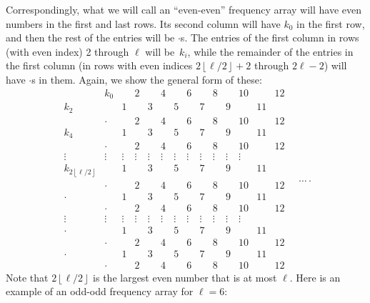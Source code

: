 \documentclass[10pt,a4paper]{amsart}
\numberwithin{equation}{section}
\theoremstyle{definition}
\begin{document}
Correspondingly, what we will call an ``even-even'' frequency array will have even numbers in the first and last rows. Its second column will have $k_0$ in the first row, and then the rest of the entries will be $\cdot$s. The entries of the first column in rows (with even index) 2 through $\ell$ will be~$k_i$, while the remainder of the entries in the first column (in rows with even indices $2\left\lfloor \ell/2\right\rfloor+2$ through $2\ell-2$) will have $\cdot$s in them. Again, we show the general form of these:
\begin{equation*}
\begin{matrix}
& k_0 && 2 && 4 && 6 && 8 && 10 && 12\\
k_2 && 1 && 3 && 5 && 7 && 9 && 11 & \\
& \cdot && 2 && 4 && 6 && 8 && 10 && 12\\
k_4 && 1 && 3 && 5 && 7 && 9 && 11 & \\
& \cdot && 2 && 4 && 6 && 8 && 10 && 12\\
\vdots & \vdots &\vdots& \vdots &\vdots& \vdots &\vdots& \vdots &\vdots& \vdots &\vdots& \vdots\\
k_{2\left\lfloor \ell/2\right\rfloor} && 1 && 3 && 5 && 7 && 9 && 11 & \\
& \cdot && 2 && 4 && 6 && 8 && 10 && 12\\
\cdot && 1 && 3 && 5 && 7 && 9 && 11 & \\
& \cdot && 2 && 4 && 6 && 8 && 10 && 12\\
\vdots & \vdots &\vdots& \vdots &\vdots& \vdots &\vdots& \vdots &\vdots& \vdots &\vdots& \vdots\\
\cdot && 1 && 3 && 5 && 7 && 9 && 11 & \\
& \cdot && 2 && 4 && 6 && 8 && 10 && 12 \\
\cdot && 1 && 3 && 5 && 7 && 9 && 11 & \\
& \cdot && 2 && 4 && 6 && 8 && 10 && 12
 \end{matrix}\quad\dots \,.
\end{equation*}
Note that $2\left\lfloor \ell/2\right\rfloor$ is the largest even number that is at most $\ell$. Here is an example of an odd-odd frequency array for $\ell=6$:
\end{document}
